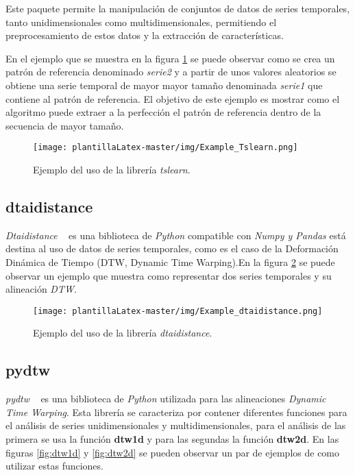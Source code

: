 Este paquete permite la manipulación de conjuntos de datos de series temporales, tanto unidimensionales como multidimensionales, permitiendo el preprocesamiento de estos datos y la extracción de características.

En el ejemplo que se muestra en la figura \ref{fig:ts1} se puede observar como se crea un patrón de referencia denominado \textit{serie2} y a partir de unos valores aleatorios se obtiene una serie temporal de mayor mayor tamaño denominada \textit{serie1} que contiene al patrón de referencia.
El objetivo de este ejemplo es mostrar como el algoritmo puede extraer a la perfección el patrón de referencia dentro de la secuencia de mayor tamaño.

\begin{figure}[H]
    \centering
    \texttt{[image: plantillaLatex-master/img/Example\_Tslearn.png]}
    \caption{ Ejemplo del uso de la librería \textit{tslearn}.}
    \label{fig:ts1}
\end{figure}


\subsection{dtaidistance}
\textit{Dtaidistance} ~\cite{wiki:dt1} es una biblioteca de \textit{Python} compatible con \textit{Numpy y Pandas} está destina al uso de datos de series temporales, como es el caso de la Deformación Dinámica de Tiempo (DTW, Dynamic Time Warping).En la figura \ref{fig:dta1} se puede observar un ejemplo que muestra como representar dos series temporales y su alineación \emph{DTW}.

\begin{figure}[H]
    \centering
    \texttt{[image: plantillaLatex-master/img/Example\_dtaidistance.png]}
    \caption{Ejemplo del uso de la librería \textit{dtaidistance}.}
    \label{fig:dta1}
\end{figure}


\subsection{pydtw}
\textit{pydtw} ~\cite{wiki:pydtw1} es una biblioteca de \textit{Python} utilizada para las alineaciones \emph{Dynamic Time Warping}. Esta librería se caracteriza por contener diferentes funciones para el análisis de series unidimensionales y multidimensionales, para el análisis de las primera se usa la función \textbf{dtw1d} y para las segundas la función \textbf{dtw2d}. En las figuras \ref{fig:dtw1d} y \ref{fig:dtw2d} se pueden observar un par de ejemplos de como utilizar estas funciones. 

